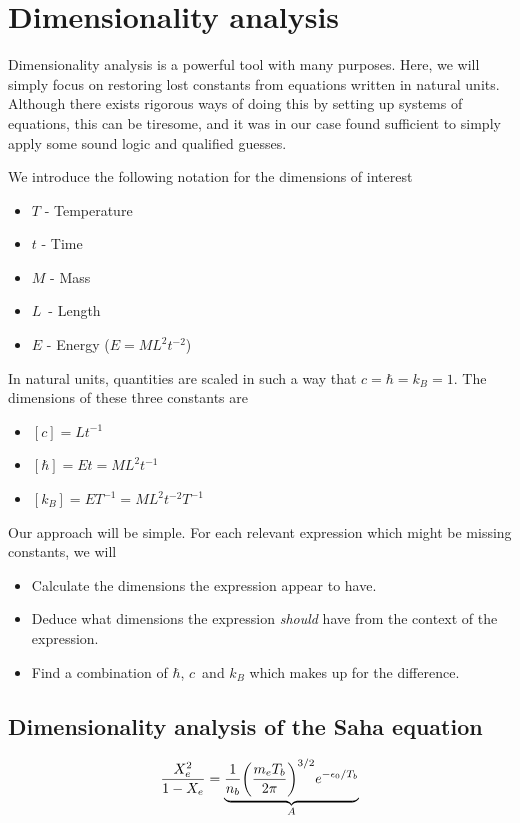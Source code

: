\documentclass[10pt, a4paper]{article}
\begin{document}
\newpage
\appendix
\section{Dimensionality analysis}\label{sec:appendixA}
Dimensionality analysis is a powerful tool with many purposes. Here, we will simply focus on restoring lost constants from equations written in natural units. Although there exists rigorous ways of doing this by setting up systems of equations, this can be tiresome, and it was in our case found sufficient to simply apply some sound logic and qualified guesses.

We introduce the following notation for the dimensions of interest
\begin{itemize}
    \item $T$ - Temperature
    \item $t$ - Time
    \item $M$ - Mass
    \item $L$ - Length
    \item $E$ - Energy ($E = ML^2t^{-2}$)
\end{itemize}

In natural units, quantities are scaled in such a way that $c = \hbar = k_B = 1$. The dimensions of these three constants are
\begin{itemize}
    \item $[c] = Lt^{-1}$
    \item $[\hbar] = Et = ML^2t^{-1}$
    \item $[k_B] = ET^{-1} = ML^2t^{-2}T^{-1}$
\end{itemize}

Our approach will be simple. For each relevant expression which might be missing constants, we will
\begin{itemize}
    \item Calculate the dimensions the expression appear to have.
    \item Deduce what dimensions the expression \textit{should} have from the context of the expression.
    \item Find a combination of $\hbar$, $c$ and $k_B$ which makes up for the difference.
\end{itemize}


\subsection{Dimensionality analysis of the Saha equation}
\begin{equation}
    \frac{X_{e}^{2}}{1-X_{e}} = \underbrace{\frac{1}{n_{b}}\qty(\frac{m_{e} T_{b}}{2 \pi})^{3 / 2} e^{-\epsilon_{0} / T_{b}}}_A
\end{equation}
\end{document}
